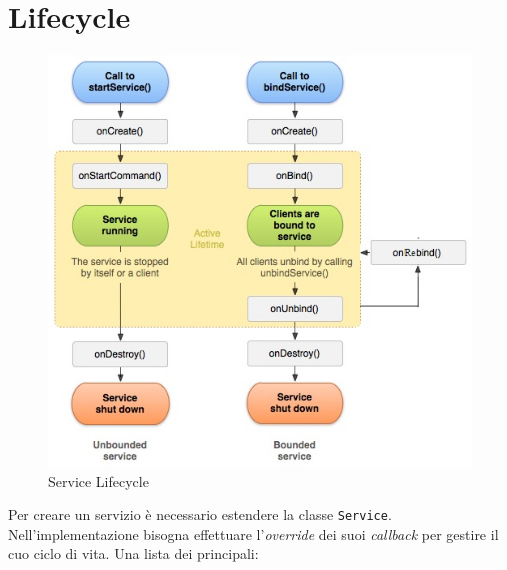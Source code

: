 \section{Lifecycle}
\begin{figure}
    \centering
    \includegraphics[scale = 0.6]{../img/service_lifecycle.jpg}
    \caption{Service Lifecycle}
    \label{fig:my_label}
\end{figure}
Per creare un servizio è necessario estendere la classe \texttt{Service}. Nell'implementazione bisogna effettuare l'\textit{override} dei suoi \textit{callback} per gestire il cuo ciclo di vita. Una lista dei principali:
